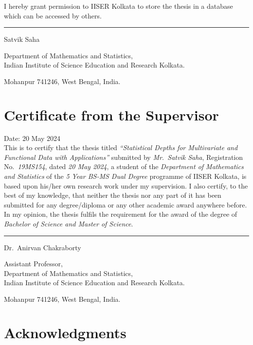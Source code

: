 \documentclass[12pt]{report}
\begin{document}
    I hereby grant permission to IISER Kolkata to store the thesis in a
    database which can be accessed by others.


    \vspace{5em}
    \rule{0.4\textwidth}{0.8pt}

    \vspace{0.1em}
    Satvik Saha

    Department of Mathematics and Statistics,\\
    Indian Institute of Science Education and Research Kolkata.

    Mohanpur 741246, West Bengal, India.

    \chapter*{Certificate from the Supervisor}

    Date: 20 May 2024\\

    This is to certify that the thesis titled \emph{``Statistical Depths for
    Multivariate and Functional Data with Applications''} submitted by
    \emph{Mr.~Satvik Saha}, Registration No.~\emph{19MS154}, dated \emph{20
    May 2024}, a student of the \textit{Department of Mathematics and
    Statistics} of the \textit{5 Year BS-MS Dual Degree} programme of IISER
    Kolkata, is based upon his/her own research work under my supervision.
    I also certify, to the best of my knowledge, that neither the thesis nor
    any part of it has been submitted for any degree/diploma or any other
    academic award anywhere before.
    In my opinion, the thesis fulfils the requirement for the award of the
    degree of \emph{Bachelor of Science and Master of Science}.

    \vspace{5em}
    \rule{0.4\textwidth}{0.8pt}

    \vspace{0.1em}
    Dr.~Anirvan Chakraborty

    Assistant Professor,\\
    Department of Mathematics and Statistics,\\
    Indian Institute of Science Education and Research Kolkata.

    Mohanpur 741246, West Bengal, India.



    \chapter*{Acknowledgments}
\end{document}
